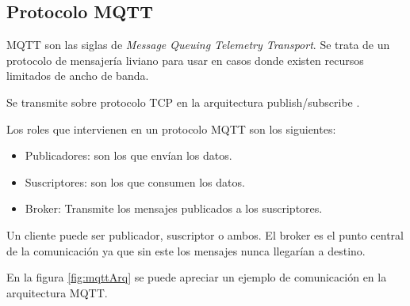 %
%
%
%
%
%

\subsection{Protocolo MQTT}
\label{subsec:mqtt}

MQTT \citep{WEBSITE:MQTT} son las siglas de \textit{Message Queuing Telemetry Transport}. Se trata de un protocolo de mensajería liviano para usar en casos donde existen recursos limitados de ancho de banda. 

Se transmite sobre protocolo TCP en la arquitectura publish/subscribe \citep{WEBSITE:PUBSUB}.

Los roles que intervienen en un protocolo MQTT son los siguientes:
\begin{itemize}
	\item Publicadores: son los que envían los datos.
	\item Suscriptores: son los que consumen los datos.
	\item Broker: Transmite los mensajes publicados a los suscriptores.	
\end{itemize}

Un cliente puede ser publicador, suscriptor o ambos. El broker es el punto central de la comunicación ya que sin este los mensajes nunca llegarían a destino. 

En la figura \ref{fig:mqttArq} se puede apreciar un ejemplo de comunicación en la arquitectura MQTT.


